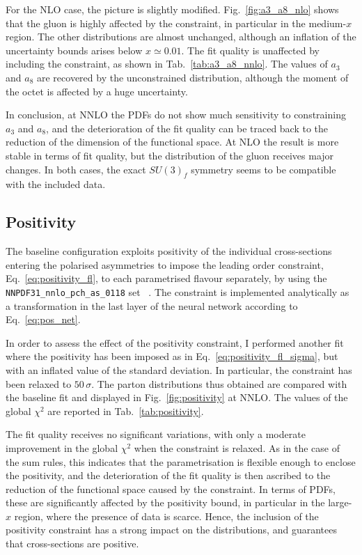 For the NLO case, the picture is slightly modified. Fig.~\ref{fig:a3_a8_nlo} shows that the gluon is highly affected by the constraint, in particular in the medium-$x$ region. The other distributions are almost unchanged, although an inflation of the uncertainty bounds arises below $x \simeq 0.01$. The fit quality is unaffected by including the constraint, as shown in Tab.~\ref{tab:a3_a8_nnlo}. The values of $a_3$ and $a_8$ are recovered by the unconstrained distribution, although the moment of the octet is affected by a huge uncertainty.%

In conclusion, at NNLO the PDFs do not show much sensitivity to constraining $a_3$ and $a_8$, and the deterioration of the fit quality can be traced back to the reduction of the dimension of the functional space. At NLO the result is more stable in terms of fit quality, but the distribution of the gluon receives major changes. In both cases, the exact $SU(3)_f$ symmetry seems to be compatible with the included data.

\subsection*{Positivity}

The baseline configuration exploits positivity of the individual cross-sections entering the polarised asymmetries to impose the leading order constraint, Eq.~\eqref{eq:positivity_fl}, to each parametrised flavour separately, by using the \texttt{NNPDF31\_nnlo\_pch\_as\_0118} set ~\cite{NNPDF:2017mvq}. The constraint is implemented analytically as a transformation in the last layer of the neural network according to Eq.~\eqref{eq:pos_net}.%

In order to assess the effect of the positivity constraint, I performed another fit where the positivity has been imposed as in Eq.~\eqref{eq:positivity_fl_sigma}, but with an inflated value of the standard deviation. In particular, the constraint has been relaxed to $50 \, \sigma$. The parton distributions thus obtained are compared with the baseline fit and displayed in Fig.~\ref{fig:positivity} at NNLO. The values of the global $\chi^2$ are reported in Tab.~\ref{tab:positivity}.%

The fit quality receives no significant variations, with only a moderate improvement in the global $\chi^2$ when the constraint is relaxed. As in the case of the sum rules, this indicates that the parametrisation is flexible enough to enclose the positivity, and the deterioration of the fit quality is then ascribed to the reduction of the functional space caused by the constraint. In terms of PDFs, these are significantly affected by the positivity bound, in particular in the large-$x$ region, where the presence of data is scarce. Hence, the inclusion of the positivity constraint has a strong impact on the distributions, and guarantees that cross-sections are positive.


